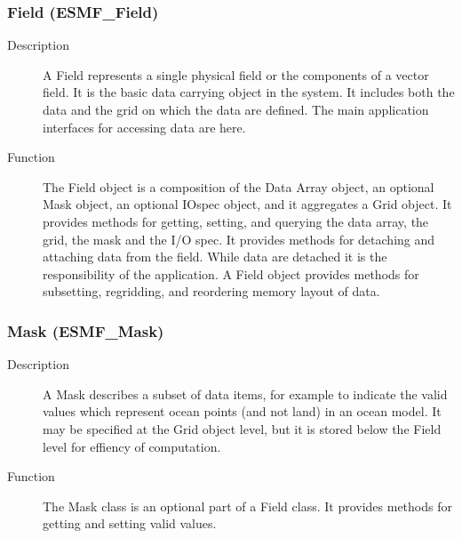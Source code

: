 \subsubsection{Field (ESMF\_Field)}
\label{sec:field} 
\begin{description} 
\item [Description] A Field represents a single physical field or the components of a 
vector field.  It is the basic data carrying object in the system.  It includes both
the data and the grid on which the data are defined.  The main application interfaces
for accessing data are here.
\item [Function] The Field object is a composition of the Data Array object, an optional
Mask object, an optional IOspec object, and it aggregates a Grid object.  It provides
methods for getting, setting, and querying the data array, the grid, the mask and
the I/O spec.  It provides methods for detaching and attaching data from the field.
While data are detached it is the responsibility of the application.  A Field object
provides methods for subsetting, regridding, and reordering memory layout of data.
\end{description}

\subsubsection{Mask (ESMF\_Mask)}
\label{sec:mask} 
\begin{description}
\item [Description] A Mask describes a subset of data items, for example to indicate
the valid values which represent ocean points (and not land) in an ocean model.  
It may be specified at the Grid object level, but it is stored below the Field level 
for effiency of computation.
\item [Function] The Mask class is an optional part of a Field class.  It provides methods
for getting and setting valid values.
\end{description}

